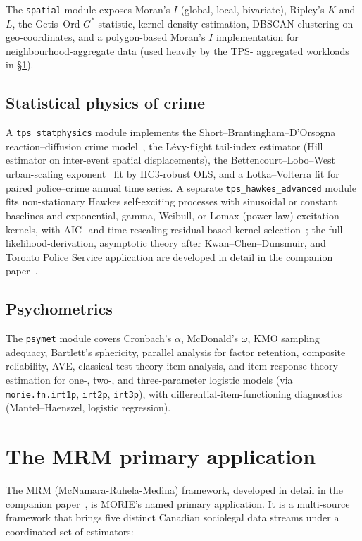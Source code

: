 \documentclass[11pt,a4paper]{article}
\theoremstyle{plain}
\theoremstyle{definition}
\theoremstyle{remark}
\begin{document}
The \texttt{spatial} module exposes Moran's $I$ (global, local,
bivariate), Ripley's $K$ and $L$, the Getis--Ord $G^{\ast}$
statistic, kernel density estimation, DBSCAN clustering on
geo-coordinates, and a polygon-based Moran's $I$ implementation
for neighbourhood-aggregate data (used heavily by the TPS-
aggregated workloads in \S\ref{sec:mrm}).

\subsection{Statistical physics of crime}

A \texttt{tps\_statphysics} module implements the
Short--Brantingham--D'Orsogna reaction--diffusion crime
model~\cite{ShortBrantingham2008}, the L\'evy-flight tail-index
estimator (Hill estimator on inter-event spatial displacements),
the Bettencourt--Lobo--West urban-scaling
exponent~\cite{Bettencourt2007} fit by HC3-robust OLS, and a
Lotka--Volterra fit for paired police--crime annual time series.
A separate \texttt{tps\_hawkes\_advanced} module fits non-stationary
Hawkes self-exciting processes with sinusoidal or constant
baselines and exponential, gamma, Weibull, or Lomax (power-law)
excitation kernels, with AIC- and time-rescaling-residual-based
kernel selection~\cite{Daley2003PointProcess}; the full
likelihood-derivation, asymptotic theory after
Kwan--Chen--Dunsmuir, and Toronto Police Service application are
developed in detail in the companion paper~\cite{Ruhela2026Hawkes}.

\subsection{Psychometrics}

The \texttt{psymet} module covers Cronbach's $\alpha$, McDonald's
$\omega$, KMO sampling adequacy, Bartlett's sphericity, parallel
analysis for factor retention, composite reliability, AVE,
classical test theory item analysis, and item-response-theory
estimation for one-, two-, and three-parameter logistic models
(via \texttt{morie.fn.irt1p}, \texttt{irt2p}, \texttt{irt3p}),
with differential-item-functioning diagnostics (Mantel--Haenszel,
logistic regression).

\section{The MRM primary application}
\label{sec:mrm}

The MRM (McNamara-Ruhela-Medina) framework, developed in detail in
the companion paper~\cite{Ruhela2026MRM}, is MORIE's named
primary application. It is a multi-source framework that brings
five distinct Canadian sociolegal data streams under a coordinated
set of estimators:
\end{document}
